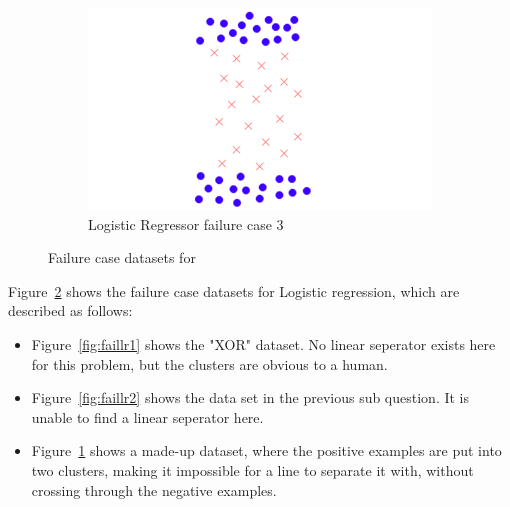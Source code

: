\documentclass[letterpaper,10pt]{article} %
\begin{document}
\begin{figure}[h]
\begin{subfigure}[b]{\textwidth}
\includegraphics[width=\textwidth]{handout/3-2/logistic3}
\caption{Logistic Regressor failure case 3}
\label{fig:faillr3}
\end{subfigure}

\caption{Failure case datasets for }\label{fig:faillr}
\end{figure}

Figure~\ref{fig:faillr} shows the failure case datasets for Logistic regression, which are described as follows:

\begin{itemize}
\item Figure~\ref{fig:faillr1} shows the "XOR" dataset. No linear seperator exists here for this problem, but the clusters are obvious to a human.
\item Figure~\ref{fig:faillr2} shows the data set in the previous sub question. It is unable to find a linear seperator here.
\item Figure~\ref{fig:faillr3} shows a made-up dataset, where the positive examples are put into two clusters, making it impossible for a line to separate it with, without crossing through the negative examples.
\end{itemize}
\end{document}
